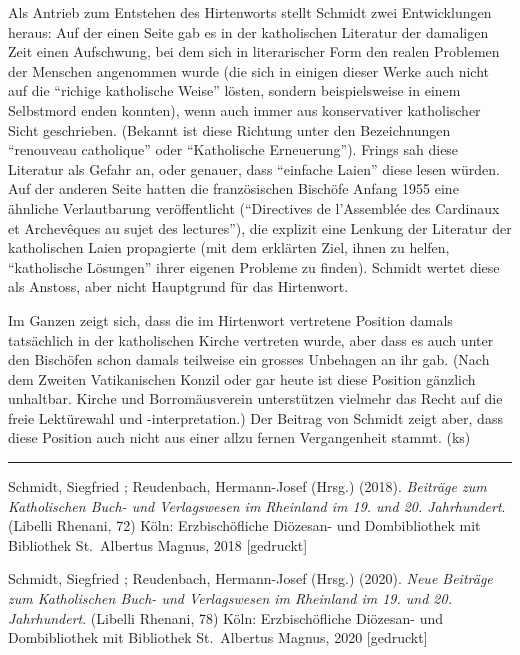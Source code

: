 \documentclass[a4paper,
fontsize=11pt,
oneside,
numbers=noperiodatend,
parskip=half-,
bibliography=totoc,
final
]{scrartcl}
\begin{document}
Als Antrieb zum Entstehen des Hirtenworts stellt Schmidt zwei
Entwicklungen heraus: Auf der einen Seite gab es in der katholischen
Literatur der damaligen Zeit einen Aufschwung, bei dem sich in
literarischer Form den realen Problemen der Menschen angenommen wurde
(die sich in einigen dieser Werke auch nicht auf die \enquote{richige
katholische Weise} lösten, sondern beispielsweise in einem Selbstmord
enden konnten), wenn auch immer aus konservativer katholischer Sicht
geschrieben. (Bekannt ist diese Richtung unter den Bezeichnungen
\enquote{renouveau catholique} oder \enquote{Katholische Erneuerung}).
Frings sah diese Literatur als Gefahr an, oder genauer, dass
\enquote{einfache Laien} diese lesen würden. Auf der anderen Seite
hatten die französischen Bischöfe Anfang 1955 eine ähnliche
Verlautbarung veröffentlicht (\enquote{Directives de l'Assemblée des
Cardinaux et Archevêques au sujet des lectures}), die explizit eine
Lenkung der Literatur der katholischen Laien propagierte (mit dem
erklärten Ziel, ihnen zu helfen, \enquote{katholische Lösungen} ihrer
eigenen Probleme zu finden). Schmidt wertet diese als Anstoss, aber
nicht Hauptgrund für das Hirtenwort.

Im Ganzen zeigt sich, dass die im Hirtenwort vertretene Position damals
tatsächlich in der katholischen Kirche vertreten wurde, aber dass es
auch unter den Bischöfen schon damals teilweise ein grosses Unbehagen an
ihr gab. (Nach dem Zweiten Vatikanischen Konzil oder gar heute ist diese
Position gänzlich unhaltbar. Kirche und Borromäusverein unterstützen
vielmehr das Recht auf die freie Lektürewahl und -interpretation.) Der
Beitrag von Schmidt zeigt aber, dass diese Position auch nicht aus einer
allzu fernen Vergangenheit stammt. (ks)

\begin{center}\rule{0.5\linewidth}{0.5pt}\end{center}

Schmidt, Siegfried ; Reudenbach, Hermann-Josef (Hrsg.) (2018).
\emph{Beiträge zum Katholischen Buch- und Verlagswesen im Rheinland im
19. und 20. Jahrhundert}. (Libelli Rhenani, 72) Köln: Erzbischöfliche
Diözesan- und Dombibliothek mit Bibliothek St.~Albertus Magnus, 2018
{[}gedruckt{]}

Schmidt, Siegfried ; Reudenbach, Hermann-Josef (Hrsg.) (2020).
\emph{Neue Beiträge zum Katholischen Buch- und Verlagswesen im Rheinland
im 19. und 20. Jahrhundert}. (Libelli Rhenani, 78) Köln: Erzbischöfliche
Diözesan- und Dombibliothek mit Bibliothek St.~Albertus Magnus, 2020
{[}gedruckt{]}
\end{document}
